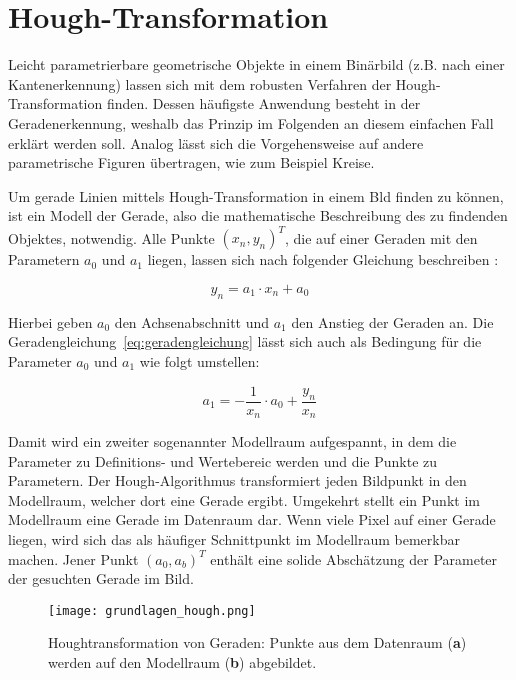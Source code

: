 \section{Hough-Transformation}

Leicht parametrierbare geometrische Objekte in einem Binärbild (z.B. nach einer Kantenerkennung) lassen sich mit dem robusten Verfahren der Hough-Transformation finden. Dessen häufigste Anwendung besteht in der Geradenerkennung, weshalb das Prinzip im Folgenden an diesem einfachen Fall erklärt werden soll. Analog lässt sich die Vorgehensweise auf andere parametrische Figuren übertragen, wie zum Beispiel Kreise.

Um gerade Linien mittels Hough-Transformation in einem Bld finden zu können, ist ein Modell der Gerade, also die mathematische Beschreibung des zu findenden Objektes, notwendig. Alle Punkte \( (x_n, y_n)^T \), die auf einer Geraden mit den Parametern \(a_0\) und \(a_1\) liegen, lassen sich nach folgender Gleichung beschreiben \autocite{jaehneDigitaleBildverarbeitungMit2005}:

\begin{equation}
y_n = a_1 \cdot x_n +a_0
\label{eq:geradengleichung}
\end{equation}

Hierbei geben \(a_0\) den Achsenabschnitt und \(a_1\) den Anstieg der Geraden an. Die Geradengleichung~\ref{eq:geradengleichung} lässt sich auch als Bedingung für die Parameter \(a_0\) und \(a_1\) wie folgt umstellen:

\begin{equation}
a_1 = -\frac{1}{x_n} \cdot a_0 + \frac{y_n}{x_n}
\end{equation}

Damit wird ein zweiter sogenannter Modellraum aufgespannt, in dem die Parameter zu Definitions- und Wertebereic werden und die Punkte zu Parametern. Der Hough-Algorithmus transformiert jeden Bildpunkt in den Modellraum, welcher dort eine Gerade ergibt. Umgekehrt stellt ein Punkt im Modellraum eine Gerade im Datenraum dar. Wenn viele Pixel auf einer Gerade liegen, wird sich das als häufiger Schnittpunkt im Modellraum bemerkbar machen. Jener Punkt \( (a_0, a_b)^T \) enthält eine solide Abschätzung der Parameter der gesuchten Gerade im Bild.

\begin{figure}[H] %
  \centering
  \texttt{[image: grundlagen\_hough.png]}
  \caption{Houghtransformation von Geraden: Punkte aus dem Datenraum (\textbf{a}) werden auf den Modellraum (\textbf{b}) abgebildet.}
\end{figure} 

